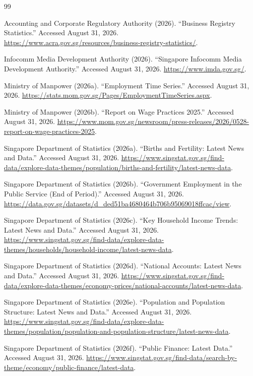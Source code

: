 \begin{thebibliography}{99}
\setlength{\itemsep}{0.55em}
\raggedright {} 

\bibitem{} Accounting and Corporate Regulatory Authority (2026). ``Business Registry Statistics.'' Accessed August 31, 2026. \url{https://www.acra.gov.sg/resources/business-registry-statistics/}.

\bibitem{} Infocomm Media Development Authority (2026). ``Singapore Infocomm Media Development Authority.'' Accessed August 31, 2026. \url{https://www.imda.gov.sg/}.

\bibitem{} Ministry of Manpower (2026a). ``Employment Time Series.'' Accessed August 31, 2026. \url{https://stats.mom.gov.sg/Pages/EmploymentTimeSeries.aspx}.

\bibitem{} Ministry of Manpower (2026b). ``Report on Wage Practices 2025.'' Accessed August 31, 2026. \url{https://www.mom.gov.sg/newsroom/press-releases/2026/0528-report-on-wage-practices-2025}.

\bibitem{} Singapore Department of Statistics (2026a). ``Births and Fertility: Latest News and Data.'' Accessed August 31, 2026. \url{https://www.singstat.gov.sg/find-data/explore-data-themes/population/births-and-fertility/latest-news-data}.

\bibitem{} Singapore Department of Statistics (2026b). ``Government Employment in the Public Service (End of Period).'' Accessed August 31, 2026. \url{https://data.gov.sg/datasets/d_ded51ba4680464b706b95069018ffcac/view}.

\bibitem{} Singapore Department of Statistics (2026c). ``Key Household Income Trends: Latest News and Data.'' Accessed August 31, 2026. \url{https://www.singstat.gov.sg/find-data/explore-data-themes/households/household-income/latest-news-data}.

\bibitem{} Singapore Department of Statistics (2026d). ``National Accounts: Latest News and Data.'' Accessed August 31, 2026. \url{https://www.singstat.gov.sg/find-data/explore-data-themes/economy-prices/national-accounts/latest-news-data}.

\bibitem{} Singapore Department of Statistics (2026e). ``Population and Population Structure: Latest News and Data.'' Accessed August 31, 2026. \url{https://www.singstat.gov.sg/find-data/explore-data-themes/population/population-and-population-structure/latest-news-data}.

\bibitem{} Singapore Department of Statistics (2026f). ``Public Finance: Latest Data.'' Accessed August 31, 2026. \url{https://www.singstat.gov.sg/find-data/search-by-theme/economy/public-finance/latest-data}.


\end{thebibliography}
